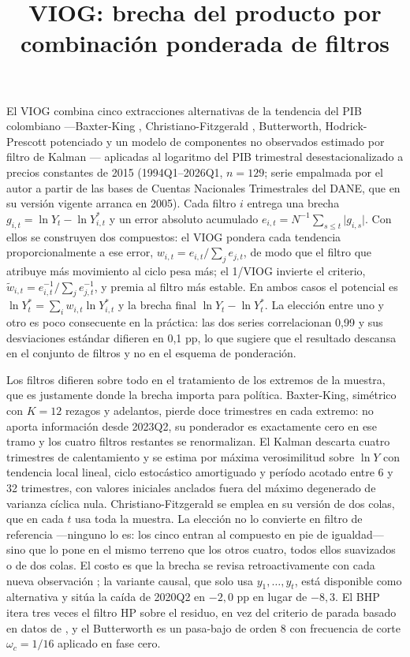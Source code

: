 \documentclass[11pt]{article}
\title{VIOG: brecha del producto por combinación ponderada de filtros}
\author{}
\date{}
\begin{document}
\maketitle

El VIOG combina cinco extracciones alternativas de la tendencia del PIB colombiano
---Baxter-King \citep{baxter_king_1999}, Christiano-Fitzgerald
\citep{christiano_fitzgerald_2003}, Butterworth, Hodrick-Prescott potenciado
\citep{phillips_shi_2021} y un modelo de componentes no observados estimado por filtro de
Kalman \citep{harvey_1989}--- aplicadas al logaritmo del PIB trimestral
desestacionalizado a precios constantes de 2015 (1994Q1--2026Q1, $n=129$; serie empalmada
por el autor a partir de las bases de Cuentas Nacionales Trimestrales del DANE, que en su
versión vigente arranca en 2005). Cada filtro $i$ entrega una brecha
$g_{i,t}=\ln Y_t-\ln Y^{*}_{i,t}$ y un error absoluto acumulado
$e_{i,t}=N^{-1}\sum_{s\leq t}\lvert g_{i,s}\rvert$. Con ellos se construyen dos compuestos: el
VIOG pondera cada tendencia proporcionalmente a ese error,
$w_{i,t}=e_{i,t}\big/\sum_j e_{j,t}$, de modo que el filtro que atribuye más movimiento al
ciclo pesa más; el 1/VIOG invierte el criterio,
$\tilde w_{i,t}=e_{i,t}^{-1}\big/\sum_j e_{j,t}^{-1}$, y premia al filtro más estable. En
ambos casos el potencial es $\ln Y^{*}_t=\sum_i w_{i,t}\ln Y^{*}_{i,t}$ y la brecha final
$\ln Y_t-\ln Y^{*}_t$. La elección entre uno y otro es poco consecuente en la práctica: las
dos series correlacionan 0,99 y sus desviaciones estándar difieren en 0,1 pp, lo que sugiere
que el resultado descansa en el conjunto de filtros y no en el esquema de ponderación.

Los filtros difieren sobre todo en el tratamiento de los extremos de la muestra, que es
justamente donde la brecha importa para política. Baxter-King, simétrico con $K=12$ rezagos y
adelantos, pierde doce trimestres en cada extremo: no aporta información desde 2023Q2, su
ponderador es exactamente cero en ese tramo y los cuatro filtros restantes se renormalizan.
El Kalman descarta cuatro trimestres de calentamiento y se estima por máxima verosimilitud
sobre $\ln Y$ con tendencia local lineal, ciclo estocástico amortiguado y período acotado
entre 6 y 32 trimestres, con valores iniciales anclados fuera del máximo degenerado de
varianza cíclica nula. Christiano-Fitzgerald se emplea en su versión de dos colas, que en cada
$t$ usa toda la muestra. La elección no lo convierte en filtro de referencia ---ninguno lo es:
los cinco entran al compuesto en pie de igualdad--- sino que lo pone en el mismo terreno que
los otros cuatro, todos ellos suavizados o de dos colas. El costo es que la brecha se revisa
retroactivamente con cada nueva observación \citep{orphanides_vannorden_2002}; la variante
causal, que solo usa $y_1,\dots,y_t$, está disponible como alternativa y sitúa la caída de
2020Q2 en $-2{,}0$ pp en lugar de $-8{,}3$.
El BHP itera tres veces el filtro HP \citep[$\lambda=1600$;][]{hodrick_prescott_1997} sobre el residuo, en vez del criterio de
parada basado en datos de \citet{phillips_shi_2021}, y el Butterworth es un pasa-bajo de
orden 8 con frecuencia de corte
$\omega_c=1/16$ aplicado en fase cero.
\end{document}
